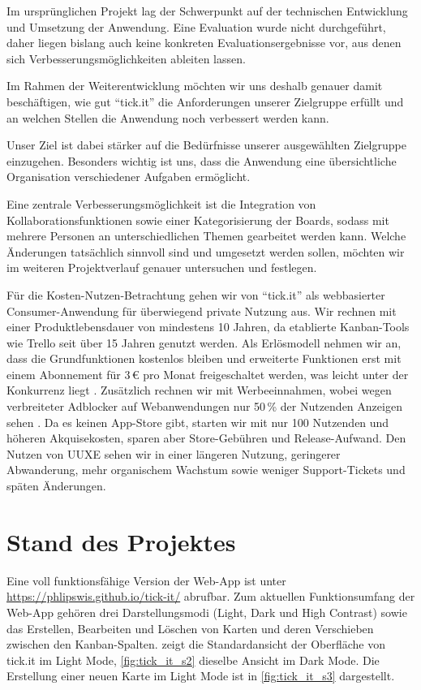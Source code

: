 Im ursprünglichen Projekt lag der Schwerpunkt auf der technischen Entwicklung und Umsetzung der Anwendung.
Eine Evaluation wurde nicht durchgeführt, daher liegen bislang auch keine konkreten Evaluationsergebnisse vor, aus denen sich Verbesserungsmöglichkeiten ableiten lassen.

Im Rahmen der Weiterentwicklung möchten wir uns deshalb genauer damit beschäftigen, wie gut \enquote{tick.it} die Anforderungen unserer Zielgruppe erfüllt und an welchen Stellen die Anwendung noch verbessert werden kann.

Unser Ziel ist dabei stärker auf die Bedürfnisse unserer ausgewählten Zielgruppe einzugehen.
Besonders wichtig ist uns, dass die Anwendung eine übersichtliche Organisation verschiedener Aufgaben ermöglicht.

Eine zentrale Verbesserungsmöglichkeit ist die Integration von Kollaborationsfunktionen sowie einer Kategorisierung der Boards, sodass mit mehrere Personen an unterschiedlichen Themen gearbeitet werden kann.
Welche Änderungen tatsächlich sinnvoll sind und umgesetzt werden sollen, möchten wir im weiteren Projektverlauf genauer untersuchen und festlegen.


Für die Kosten-Nutzen-Betrachtung gehen wir von \enquote{tick.it} als webbasierter Consumer-Anwendung für überwiegend private Nutzung aus.
Wir rechnen mit einer Produktlebensdauer von mindestens 10 Jahren, da etablierte Kanban-Tools wie Trello seit über 15 Jahren genutzt werden.
Als Erlösmodell nehmen wir an, dass die Grundfunktionen kostenlos bleiben und erweiterte Funktionen erst mit einem Abonnement für 3\,€ pro Monat freigeschaltet werden, was leicht unter der Konkurrenz liegt \parencite{atlassian-trello-pricing}.
Zusätzlich rechnen wir mit Werbeeinnahmen, wobei wegen verbreiteter Adblocker auf Webanwendungen nur 50\,\% der Nutzenden Anzeigen sehen \parencite{munoz2026adblocker}.
Da es keinen App-Store gibt, starten wir mit nur 100 Nutzenden und höheren Akquisekosten, sparen aber Store-Gebühren und Release-Aufwand.
Den Nutzen von UUXE sehen wir in einer längeren Nutzung, geringerer Abwanderung, mehr organischem Wachstum sowie weniger Support-Tickets und späten Änderungen.



\section{Stand des Projektes}
\label{sec:pt-screenshots}
Eine voll funktionsfähige Version der Web-App ist unter \href{https://phlipswis.github.io/tick-it/}{https://phlipswis.github.io/tick-it/} abrufbar.
Zum aktuellen Funktionsumfang der Web-App gehören drei Darstellungsmodi (Light, Dark und High Contrast) sowie das Erstellen, Bearbeiten und Löschen von Karten und deren Verschieben zwischen den Kanban-Spalten.
 zeigt die Standardansicht der Oberfläche von tick.it im Light Mode, \cref{fig:tick_it_s2} dieselbe Ansicht im Dark Mode.
Die Erstellung einer neuen Karte im Light Mode ist in \cref{fig:tick_it_s3} dargestellt.

